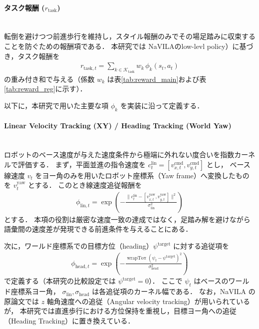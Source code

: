 \paragraph{タスク報酬 ($r_{\mathrm{task}}$)}\quad\\

転倒を避けつつ前進歩行を維持し，スタイル報酬のみでその場足踏みに収束することを防ぐための報酬項である．
本研究では NaVILAのlow-levl policy\cite{NaVILA_paper}）に基づき，タスク報酬を
\begin{align}
  r_{\mathrm{task},t} = \sum_{k \in \mathcal{K}_{\mathrm{task}}} w_k\,\phi_k(s_t, a_t)
  \label{eq:task_reward_sum}
\end{align}
の重み付き和で与える（係数 $w_k$ は表\ref{tab:reward_main}および表\ref{tab:reward_reg}に示す）．

以下に，本研究で用いた主要な項 $\phi_k$ を実装に沿って定義する．

\paragraph{Linear Velocity Tracking (XY) / Heading Tracking (World Yaw)}\quad\\

ロボットのベース速度が与えた速度条件から極端に外れない度合いを指数カーネルで評価する．
まず，平面並進の指令速度を $c^{\mathrm{lin}}_t = [v^{\mathrm{cmd}}_{x,t}, v^{\mathrm{cmd}}_{y,t}]$ とし，
ベース線速度 $v_t$ をヨー角のみを用いたロボット座標系（Yaw frame）へ変換したものを $v^{\mathrm{yaw}}_t$ とする．
このとき線速度追従報酬を
\begin{align}
  \phi_{\mathrm{lin},t} = \exp\!\left(-\frac{\|c^{\mathrm{lin}}_t - [v^{\mathrm{yaw}}_{x,t}, v^{\mathrm{yaw}}_{y,t}]\|^2}{\sigma_{\mathrm{lin}}^2}\right)
  \label{eq:task_track_lin}
\end{align}
とする．
本項の役割は厳密な速度一致の達成ではなく，足踏み解を避けながら語彙間の速度差が発現できる前進条件を与えることにある．

次に，ワールド座標系での目標方位（heading）$\psi^{\mathrm{target}}$ に対する追従項を
\begin{align}
  \phi_{\mathrm{head},t}
  =
  \exp\!\left(
  -\frac{\operatorname{wrapTo\pi}(\psi_t-\psi^{\mathrm{target}})^2}{\sigma_{\mathrm{head}}^2}
  \right)
  \label{eq:task_track_heading}
\end{align}
で定義する（本研究の比較設定では $\psi^{\mathrm{target}}=0$）．
ここで $\psi_t$ はベースのワールド座標系ヨー角，
$\sigma_{\mathrm{lin}},\sigma_{\mathrm{head}}$ は各追従項のカーネル幅である．
なお，NaVILA の原論文では $z$ 軸角速度への追従（Angular velocity tracking）が用いられているが，
本研究では直進歩行における方位保持を重視し，目標ヨー角への追従（Heading Tracking）に置き換えている．

